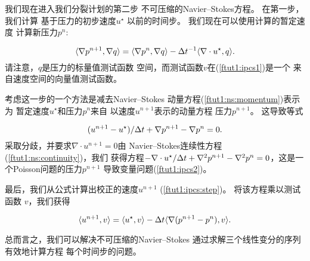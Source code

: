 我们现在进入我们分裂计划的第二步
不可压缩的Navier--Stokes方程。 在第一步，我们计算
基于压力的初步速度$u^{\star}$
以前的时间步。 我们现在可以使用计算的暂定速度
计算新压力$p^n$:

\begin{equation}
\label{ftut1:ipcs2}
  \langle \nabla p^{n+1}, \nabla q \rangle
  = \langle {\nabla p^{n}},{\nabla q} \rangle
  - \dt^{-1} \langle{\nabla \cdot u^{\star}},{q} \rangle.
\end{equation}
请注意，$q$是压力的标量值测试函数
空间，而测试函数$v$在(\ref{ftut1:ipcs1})是一个
来自速度空间的向量值测试函数。

考虑这一步的一个方法是减去Navier--Stokes
动量方程(\ref{ftut1:ns:momentum})表示为
暂定速度$u^{\star}$和压力$p^n$来自
以速度$u^{n+1}$表示的动量方程
压力$p^{n+1}$。 这导致等式

\begin{equation} \label{ftut1:ipcs:step}
  (u^{n+1} - u^{\star}) / \dt + \nabla p^{n+1} - \nabla p^n = 0.
\end{equation}
采取分歧，并要求$\nabla \cdot u^{n+1} = 0$由
Navier--Stokes连续性方程(\ref{ftut1:ns:continuity})，我们
获得方程$-\nabla\cdot u^{\star} / \dt + \nabla^2 p^{n+1} -
\nabla^2 p^n = 0$，这是一个Poisson问题的压力$p^{n+1}$
导致变量问题(\ref{ftut1:ipcs2})。

最后，我们从公式计算出校正的速度$u^{n+1}$
(\ref{ftut1:ipcs:step})。 将该方程乘以测试函数
$v$，我们获得

\begin{equation}
\label{ftut1:ipcs3}
  \langle {u^{n+1}},{v} \rangle
  =
  \langle {u^{\star}},{v} \rangle
  - \dt \langle {\nabla(p^{n+1}-p^{n})},{v} \rangle.
\end{equation}

总而言之，我们可以解决不可压缩的Navier--Stokes
通过求解三个线性变分的序列有效地计算方程
每个时间步的问题。
